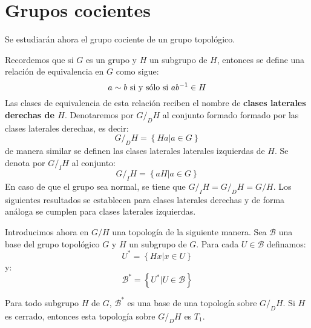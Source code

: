 \documentclass[12pt]{report}
\theoremstyle{largebreak}
\begin{document}
    \section{Grupos cocientes}

    Se estudiarán ahora el grupo cociente de un grupo topológico. 

    Recordemos que si $G$ es un grupo y $H$ un subgrupo de $H$, entonces se define una relación de equivalencia en $G$ como sigue:
    \begin{equation*}
        a\sim b\textup{ si y sólo si }ab^{-1}\in H
    \end{equation*}
    Las clases de equivalencia de esta relación reciben el nombre de \textbf{clases laterales derechas de $H$}. Denotaremos por $G/_DH$ al conjunto formado formado por las clases laterales derechas, es decir:
    \begin{equation*}
        G/_DH=\left\{Ha\Big|a\in G \right\}
    \end{equation*}
    de manera similar se definen las clases laterales laterales izquierdas de $H$. Se denota por $G/_I H$ al conjunto:
    \begin{equation*}
        G/_IH=\left\{aH\Big|a\in G \right\}
    \end{equation*}
    En caso de que el grupo sea normal, se tiene que $G/_IH=G/_DH=G/H$. Los siguientes resultados se establecen para clases laterales derechas y de forma análoga se cumplen para clases laterales izquierdas.

    Introducimos ahora en $G/H$ una topología de la siguiente manera. Sea $\mathcal{B}$ una base del grupo topológico $G$ y $H$ un subgrupo de $G$. Para cada $U\in\mathcal{B}$ definamos:
    \begin{equation*}
        U^*=\left\{ Hx\Big|x\in U \right\}
    \end{equation*}
    y:
    \begin{equation*}
        \mathcal{B}^*=\left\{U^*\Big|U\in\mathcal{B} \right\}
    \end{equation*}

    \begin{propo}
        Para todo subgrupo $H$ de $G$, $\mathcal{B}^*$ es una base de una topología sobre $G/_DH$. Si $H$ es cerrado, entonces esta topología sobre $G/_DH$ es $T_1$.
    \end{propo}
\end{document}
